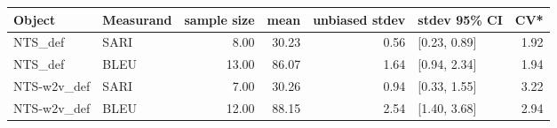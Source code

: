 \begin{tabular}{llrrrlr}
\toprule
      Object & Measurand & sample size &  mean & unbiased stdev &  stdev 95\% CI &  CV* \\
\midrule
     NTS\_def &      SARI &        8.00 & 30.23 &           0.56 &  [0.23, 0.89] & 1.92 \\
     NTS\_def &      BLEU &       13.00 & 86.07 &           1.64 &  [0.94, 2.34] & 1.94 \\
 NTS-w2v\_def &      SARI &        7.00 & 30.26 &           0.94 &  [0.33, 1.55] & 3.22 \\
 NTS-w2v\_def &      BLEU &       12.00 & 88.15 &           2.54 &  [1.40, 3.68] & 2.94 \\
\bottomrule
\end{tabular}
